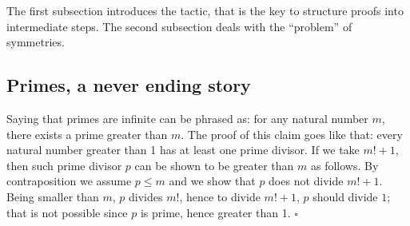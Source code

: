 The first subsection introduces the  tactic, that is the key
to structure proofs into intermediate steps.  The second subsection
deals with the ``problem'' of symmetries.

\subsection{Primes, a never ending story}\label{sec:infprimes}

Saying that primes are infinite can be phrased as: for any natural number
$m$, there exists a prime greater than $m$.  The proof of this claim goes like
that: every natural number greater than 1 has at least one prime divisor.  If
we take $m! + 1$, then such prime divisor $p$ can be shown to be greater than $m$ as
follows.  By contraposition we assume $p \leq m$ and we show that $p$
does not divide $m!+1$.
Being smaller than $m$, $p$ divides $m!$, hence to divide $m!+1$, $p$ should divide
$1$; that is not possible since $p$ is prime, hence greater than 1.
\hfill$\square$



% 
% 
% 
% 
% 
% 

